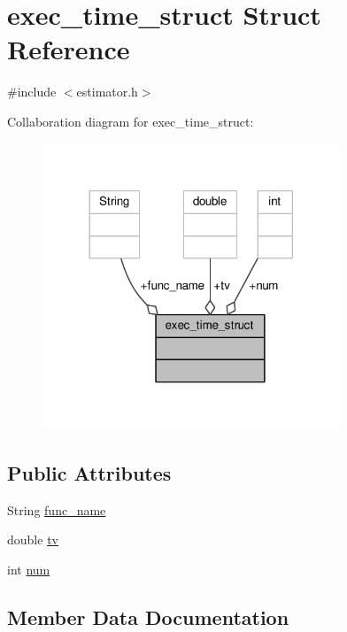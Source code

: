 \hypertarget{structexec__time__struct}{}\section{exec\+\_\+time\+\_\+struct Struct Reference}
\label{structexec__time__struct}


{\ttfamily \#include $<$estimator.\+h$>$}



Collaboration diagram for exec\+\_\+time\+\_\+struct\+:
\nopagebreak
\begin{figure}[H]
\begin{center}
\leavevmode
\includegraphics[width=252pt]{structexec__time__struct__coll__graph}
\end{center}
\end{figure}
\subsection*{Public Attributes}
\begin{DoxyCompactItemize}
\item 
String \hyperlink{structexec__time__struct_a29e6eb640031d9511b93e6f804ce5378}{func\+\_\+name}
\item 
double \hyperlink{structexec__time__struct_a58e8eec3a309584d7e9dfc76b1a38f62}{tv}
\item 
int \hyperlink{structexec__time__struct_ae25487e7ece38060f921344945dae62d}{num}
\end{DoxyCompactItemize}


\subsection{Member Data Documentation}
